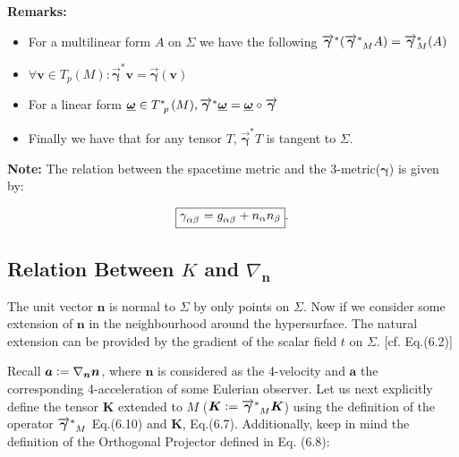 \documentclass[12pt]{article}
\renewcommand{\vec}[1]{\bm{#1}}
\numberwithin{equation}{section}
\numberwithin{theorem}{subsection}
\newcommand{\defeq}{\vcentcolon=}
\begin{document}
\textbf{Remarks:} \begin{itemize} \item For a multilinear form $A$ on $\Sigma$ we have the following $\overrightarrow{\vec{\gamma}}^{*}(\tensor{\overrightarrow{\vec{\gamma}}}{^*_M} A) = \overrightarrow{\vec{\gamma}}^{*}_{M} (A)$ \item $\forall \vec{v} \in T_{p}(M) \colon \overrightarrow{\vec{\gamma}}^{*}\vec{v} = \overrightarrow{\vec{\gamma}}(\vec{v})$

\item For a linear form $\underline{\vec{\omega}} \in \tensor{T}{^*_p}(M), \overrightarrow{\vec{\gamma}}^{*} \underline{\vec{\omega}} = \underline{\vec{\omega}} \circ \overrightarrow{\vec{\gamma}}$ 

\item Finally we have that for any tensor $T$, $\overrightarrow{\vec{\gamma}}^{*}T$ is tangent to $\Sigma$.

\end{itemize}

\textbf{Note:} The relation between the spacetime metric and the 3-metric($\vec{\gamma}$) is given by:

$$\boxed{\tensor{\gamma}{_\alpha_\beta}=\tensor{g}{_\alpha_\beta}+n_{\alpha} n_{\beta}}.$$

\subsection{Relation Between $K$ and $\nabla_{\vec{n}}$}

The unit vector $\vec{n}$ is normal to $\Sigma$ by only points on $\Sigma$. Now if we consider some extension of $\vec{n}$ in the neighbourhood around the hypersurface. The natural extension can be provided by the gradient of the scalar field $t$ on $\Sigma$. [cf. Eq.(6.2)]

\newline Recall $\vec{a} \defeq \nabla_{\vec{n}}\vec{n}$, where $\vec{n}$ is considered as the 4-velocity and $\vec{a}$ the corresponding 4-acceleration of some Eulerian observer. Let us next explicitly define the tensor $\vec{K}$ extended to $M$ ($\vec{K}\defeq \tensor{\overrightarrow{\vec{\gamma}}}{^*_M}\vec{K}$) using the definition of the operator $\tensor{\overrightarrow{\vec{\gamma}}}{^*_M}$ Eq.(6.10) and $\vec{K}$, Eq.(6.7). Additionally, keep in mind the definition of the Orthogonal Projector defined in Eq. (6.8):

 
\end{document}
